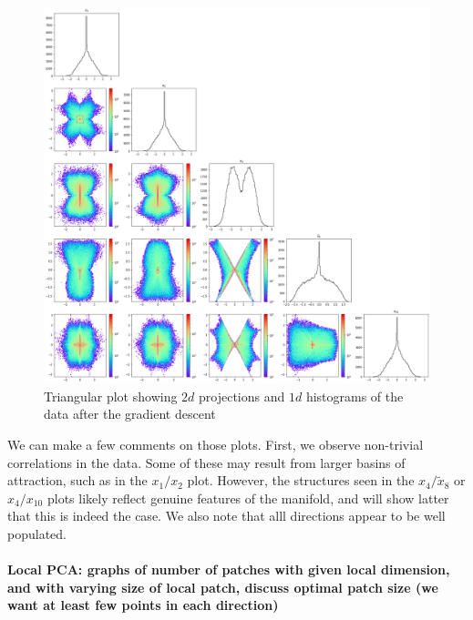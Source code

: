 \documentclass[11pt]{article}
\begin{document}
		\begin{figure}[t]
			\centering
			\includegraphics[scale = 0.3]{Figures/triangular_plot_1_2_4_8_10_new.png} %
			\caption{Triangular plot showing $2d$ projections and $1d$ histograms of the data after the gradient descent}
			\label{triangular_plot_1_2_4_8_10}
		\end{figure}
		
		We can make a few comments on those plots. First, we observe non-trivial correlations in the data. Some of these may result from larger basins of attraction, such as in the $x_1/x_2$ plot. However, the structures seen in the $x_4/\tilde{x}_8$ or $x_4/x_{10}$ plots likely reflect genuine features of the manifold, and will show latter that this is indeed the case. We also note that alll directions appear to be well populated. 

		\paragraph{Local PCA: graphs of number of patches with given local dimension, and with varying size of local patch, discuss optimal patch size (we want at least few points in each direction)}
\end{document}
